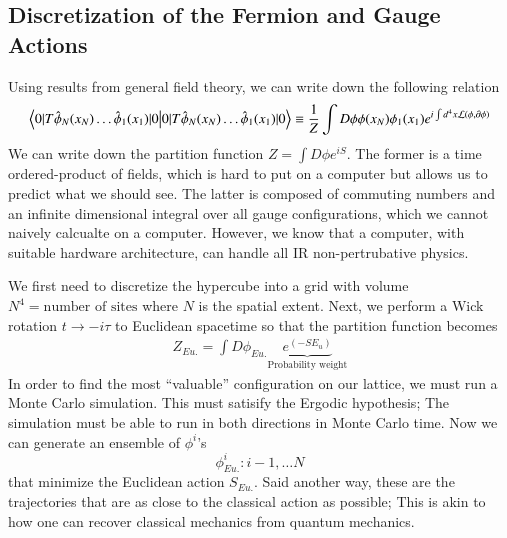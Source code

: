 \subsection{Discretization of the Fermion and Gauge Actions}
Using results from general field theory, we can write down the following relation 
\begin{align}
    \braket{0|T{\hat{\phi}_N(x_N)\dots \hat{\phi}_1}(x_1)|0} \equiv\frac{1}{Z} \int D\phi\phi(x_N)\phi_1(x_1)e^{i\int d^4x\mathcal{L}(\phi,\partial\phi)}
\end{align}
We can write down the partition function $Z = \int D\phi e^{iS}$. 
The former is a time ordered-product of fields, which is hard to put on a computer but allows us to predict what we should see. The latter is composed of commuting numbers and an infinite dimensional integral over all gauge configurations, which we cannot naively calcualte on a computer. However, we know that a computer, with suitable hardware architecture, can handle all IR non-pertrubative physics.   

We first need to discretize the hypercube into a grid with volume $N^4 = \text{number of sites}$ where $N$ is the spatial extent. Next, we perform a Wick rotation $t\rightarrow -i\tau$ to Euclidean spacetime so that the partition function becomes 
\begin{align}
    Z_{Eu.} = \int D\phi_{Eu.}\underbrace{e^{(-SE_u)}}_\text{Probability weight} 
\end{align} 
In order to find the most ``valuable'' configuration on our lattice, we must run a Monte Carlo simulation. This must satisify the Ergodic hypothesis; The simulation must be able to run in both directions in Monte Carlo time. Now we can generate an ensemble of $\phi^i$'s 
\begin{equation}
    {\phi_{Eu.}^i: i-1,\dots N} 
\end{equation} that minimize the Euclidean action $S_{Eu.}$. Said another way, these are the trajectories that are as close to the classical action as possible; This is akin to how one can recover classical mechanics from quantum mechanics. 

